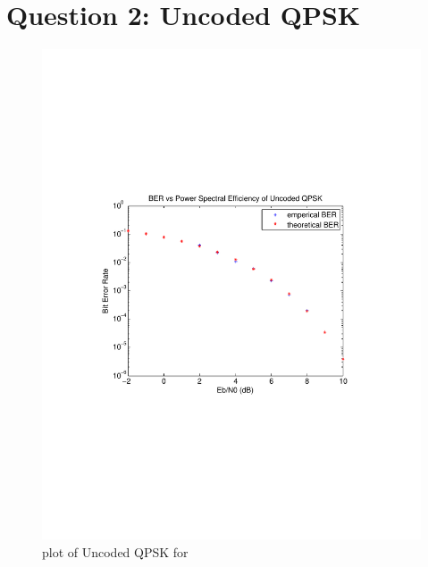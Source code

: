 \documentclass[11pt, english]{article}
\begin{document}
\section{Question 2: Uncoded QPSK}
\begin{figure}[H]
    \centering
    \includegraphics[width=.8\textwidth]{uncoded_qpsk.pdf}
    \caption{plot of Uncoded QPSK for }
    \label{th1}
\end{figure}
\end{document}
